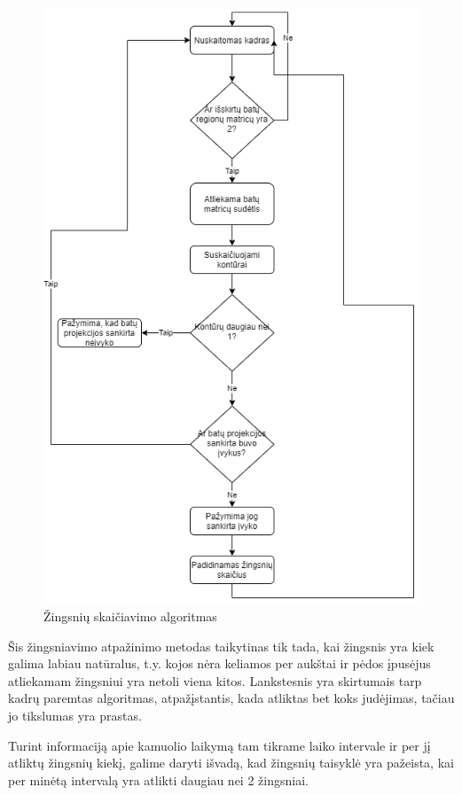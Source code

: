 \documentclass{VUMIFPSbakalaurinis}
\begin{document}
\begin{figure}[H]
	\centering
	\includegraphics[scale=0.6]{img/steps_algorithm}
	\caption{Žingsnių skaičiavimo algoritmas}
	\label{img:steps_algo}
\end{figure}

Šis žingsniavimo atpažinimo metodas taikytinas tik tada, kai žingsnis yra kiek galima labiau natūralus, t.y. kojos nėra keliamos per aukštai ir pėdos įpusėjus atliekamam žingsniui yra netoli viena kitos. Lankstesnis yra skirtumais tarp kadrų paremtas algoritmas, atpažįstantis, kada atliktas bet koks judėjimas, tačiau jo tikslumas yra prastas.

Turint informaciją apie kamuolio laikymą tam tikrame laiko intervale ir per jį atliktų žingsnių kiekį, galime daryti išvadą, kad žingsnių taisyklė yra pažeista, kai per minėtą intervalą yra atlikti daugiau nei 2 žingsniai. 
\end{document}
